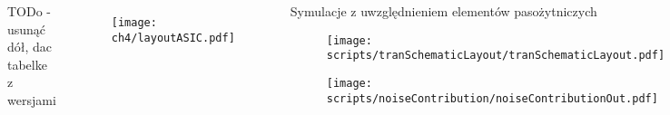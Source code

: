 \begin{frame}{}
    \begin{columns}

    TODo - usunąć dół, dac tabelke z wersjami

    \begin{figure}[H]
        \centering
        \texttt{[image: ch4/layoutASIC.pdf]} 
    \end{figure}   

    \begin{block}{
        Symulacje z uwzględnieniem elementów pasożytniczych
    }

    \begin{figure}[H]
        \centering
        \texttt{[image: scripts/tranSchematicLayout/tranSchematicLayout.pdf]}  
    \end{figure}

    \begin{figure}[H]
        \centering
        \texttt{[image: scripts/noiseContribution/noiseContributionOut.pdf]}  
    \end{figure}
    \end{block}
    \end{columns}   
  
\end{frame}



